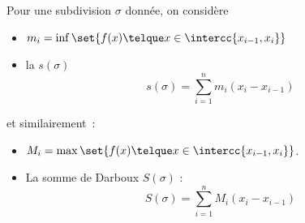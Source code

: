 \begin{frame}%
  Pour une subdivision \(\sigma\) donnée, on considère
  \begin{itemize}
  \item \(m_{i} = \inf \set{ f(x) \telque x\in \intercc{x_{i-1},x_{i}}}\)\pause
  \item la  \(s(\sigma)\)\pause
    \begin{equation*}
      s(\sigma) = \sum_{i=1}^n m_{i} (x_i - x_{i-1})
    \end{equation*}
  \end{itemize}\pause{}
  et similairement~: 
  \begin{itemize}
  \item \(M_{i} = \max \set{ f(x) \telque x\in \intercc{x_{i-1},x_{i}}}\).\pause{}
  \item La somme de Darboux  \(S(\sigma)\) :\pause{}
    \begin{equation*}
      S(\sigma) = \sum_{i=1}^n M_{i} (x_i - x_{i-1})
    \end{equation*}
  \end{itemize}
\end{frame}

